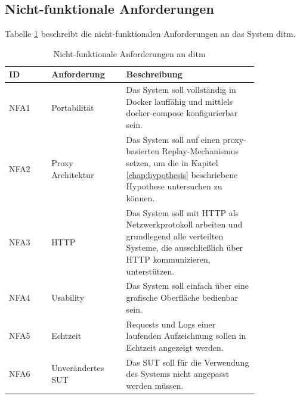 \documentclass[12pt,a4paper]{report}
\begin{document}
\subsection{Nicht-funktionale Anforderungen}
Tabelle \ref{tab:nfa} beschreibt die nicht-funktionalen Anforderungen an das System ditm.
\begin{longtable}[H]{|p{}|p{0.3\linewidth}|p{0.53\linewidth}|}
	\caption{Nicht-funktionale Anforderungen an ditm\label{tab:nfa}}                                                                                                                      \\
	\hline
	ID   & Anforderung       & Beschreibung                                                                                                                                               \\ \hline
	NFA1 & Portabilität      & Das System soll vollständig in Docker lauffähig und mittlels docker-compose konfigurierbar sein.                                                           \\ \hline
	NFA2 & Proxy Architektur & Das System soll auf einen proxy-basierten Replay-Mechanismus setzen, um die in Kapitel \ref{chap:hypothesis} beschriebene Hypothese untersuchen zu können. \\ \hline
	NFA3 & HTTP              & Das System soll mit HTTP als Netzwerkprotokoll arbeiten und grundlegend alle verteilten Systeme, die ausschließlich über HTTP kommunizieren, unterstützen. \\ \hline
	NFA4 & Usability         & Das System soll einfach über eine grafische Oberfläche bedienbar sein.                                                                                     \\ \hline
	NFA5 & Echtzeit          & Requests und Logs einer laufenden Aufzeichnung sollen in Echtzeit angezeigt werden.                                                                        \\ \hline
	NFA6 & Unverändertes SUT & Das SUT soll für die Verwendung des Systems nicht angepasst werden müssen.                                                                                 \\ \hline
\end{longtable}
\end{document}
